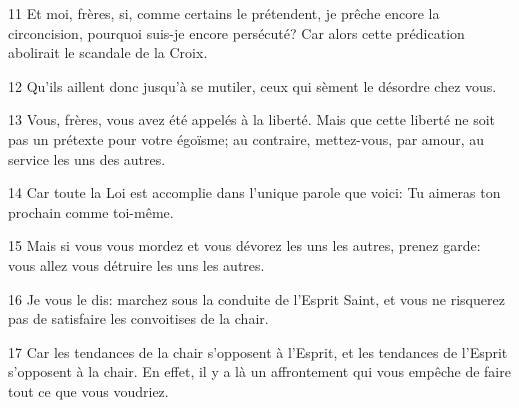 
11 Et moi, frères, si, comme certains le prétendent, je prêche encore la circoncision, pourquoi suis-je encore persécuté? Car alors cette prédication abolirait le scandale de la Croix.

12 Qu’ils aillent donc jusqu’à se mutiler, ceux qui sèment le désordre chez vous.

13 Vous, frères, vous avez été appelés à la liberté. Mais que cette liberté ne soit pas un prétexte pour votre égoïsme; au contraire, mettez-vous, par amour, au service les uns des autres.

14 Car toute la Loi est accomplie dans l’unique parole que voici: Tu aimeras ton prochain comme toi-même.

15 Mais si vous vous mordez et vous dévorez les uns les autres, prenez garde: vous allez vous détruire les uns les autres.

16 Je vous le dis: marchez sous la conduite de l’Esprit Saint, et vous ne risquerez pas de satisfaire les convoitises de la chair.

17 Car les tendances de la chair s’opposent à l’Esprit, et les tendances de l’Esprit s’opposent à la chair. En effet, il y a là un affrontement qui vous empêche de faire tout ce que vous voudriez.